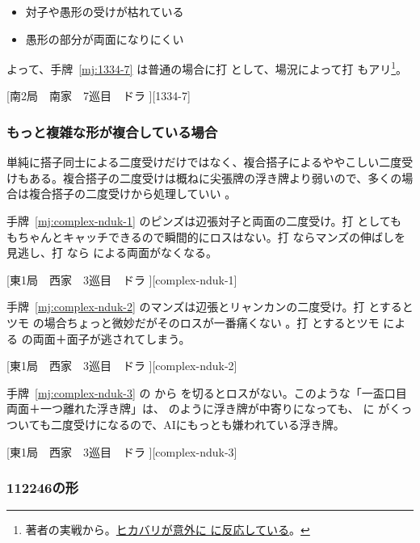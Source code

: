 \documentclass[../nankiru_main.tex]{subfiles}
\begin{document}
\begin{itemize}
\item 対子や愚形の受けが枯れている
\item 愚形の部分が両面になりにくい
\end{itemize}

よって、手牌~\ref{mj:1334-7} は普通の場合に打  として、場況によって打  もアリ\footnote{著者の実戦から。\href{https://naga.dmv.nico/htmls/d74ee2fcc180f30ce1bccb109223ac1827c57371d858de5d304b683696beabcfv2_2.html?tw=2}{ヒカバリが意外に  に反応している}。}。

[南2局　南家　7巡目　ドラ ][1334-7]


\subsubsection*{もっと複雑な形が複合している場合}

単純に搭子同士による二度受けだけではなく、複合搭子によるややこしい二度受けもある。複合搭子の二度受けは概ねに尖張牌の浮き牌より弱いので、多くの場合は複合搭子の二度受けから処理していい \citep{yuusee-complex-nidouke}。

手牌~\ref{mj:complex-nduk-1} のピンズは辺張対子と両面の二度受け。打  としても  もちゃんとキャッチできるので瞬間的にロスはない。打  ならマンズの伸ばしを見逃し、打  なら  による両面がなくなる。

[東1局　西家　3巡目　ドラ ][complex-nduk-1]

手牌~\ref{mj:complex-nduk-2} のマンズは辺張とリャンカンの二度受け。打  とするとツモ  の場合ちょっと微妙だがそのロスが一番痛くない
。打  とするとツモ  による  の両面＋面子が逃されてしまう。

[東1局　西家　3巡目　ドラ ][complex-nduk-2]

手牌~\ref{mj:complex-nduk-3} の  から  を切るとロスがない。このような「一盃口目両面＋一つ離れた浮き牌」は、 のように浮き牌が中寄りになっても、 に  がくっついても二度受けになるので、AIにもっとも嫌われている浮き牌。

[東1局　西家　3巡目　ドラ ][complex-nduk-3]


\subsubsection{112246の形}
\end{document}
